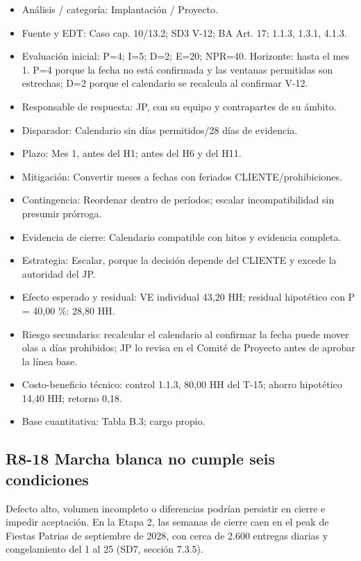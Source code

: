 \begin{itemize}[leftmargin=*,itemsep=3pt]
\item Análisis / categoría: Implantación / Proyecto.
\item Fuente y EDT: Caso cap. 10/13.2; SD3 V-12; BA Art. 17; 1.1.3, 1.3.1, 4.1.3.
\item Evaluación inicial: P=4; I=5; D=2; E=20; NPR=40. Horizonte: hasta el mes 1. P=4 porque la fecha no está confirmada y las ventanas permitidas son estrechas; D=2 porque el calendario se recalcula al confirmar V-12.
\item Responsable de respuesta: JP, con su equipo y contrapartes de su ámbito.
\item Disparador: Calendario sin días permitidos/28 días de evidencia.
\item Plazo: Mes 1, antes del H1; antes del H6 y del H11.
\item Mitigación: Convertir meses a fechas con feriados CLIENTE/prohibiciones.
\item Contingencia: Reordenar dentro de períodos; escalar incompatibilidad sin presumir prórroga.
\item Evidencia de cierre: Calendario compatible con hitos y evidencia completa.
\item Estrategia: Escalar, porque la decisión depende del CLIENTE y excede la autoridad del JP.
\item Efecto esperado y residual: VE individual 43,20 HH; residual hipotético con P = 40,00 \%: 28,80 HH.
\item Riesgo secundario: recalcular el calendario al confirmar la fecha puede mover olas a días prohibidos; JP lo revisa en el Comité de Proyecto antes de aprobar la línea base.
\item Costo-beneficio técnico: control 1.1.3, 80,00 HH del T-15; ahorro hipotético 14,40 HH; retorno 0,18.
\item Base cuantitativa: Tabla B.3; cargo propio.
\end{itemize}

\subsection*{R8-18 \textemdash{} Marcha blanca no cumple seis condiciones}

Defecto alto, volumen incompleto o diferencias podrían persistir en cierre e impedir aceptación. En la Etapa 2, las semanas de cierre caen en el peak de Fiestas Patrias de septiembre de 2028, con cerca de 2.600 entregas diarias y congelamiento del 1 al 25 (SD7, sección 7.3.5).


